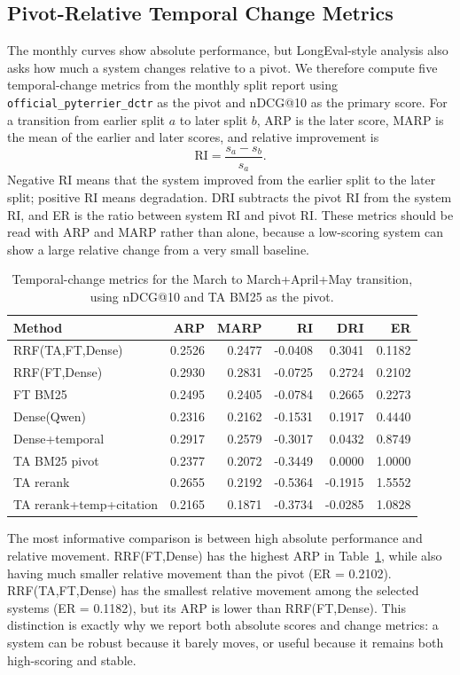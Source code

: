 \documentclass[11pt]{article}
\begin{document}
\subsection{Pivot-Relative Temporal Change Metrics}

The monthly curves show absolute performance, but LongEval-style analysis also asks how much a system changes relative to a pivot. We therefore compute five temporal-change metrics from the monthly split report using \texttt{official\_pyterrier\_dctr} as the pivot and nDCG@10 as the primary score. For a transition from earlier split $a$ to later split $b$, ARP is the later score, MARP is the mean of the earlier and later scores, and relative improvement is
\[
\mathrm{RI} = \frac{s_a - s_b}{s_a}.
\]
Negative RI means that the system improved from the earlier split to the later split; positive RI means degradation. DRI subtracts the pivot RI from the system RI, and ER is the ratio between system RI and pivot RI. These metrics should be read with ARP and MARP rather than alone, because a low-scoring system can show a large relative change from a very small baseline.

\begin{table}[ht]
\centering
\caption{Temporal-change metrics for the March to March+April+May transition, using nDCG@10 and TA BM25 as the pivot.}
\label{tab:temporal-change}
\begin{tabular}{lrrrrr}
\toprule
Method & ARP & MARP & RI & DRI & ER \\
\midrule
RRF(TA,FT,Dense) & 0.2526 & 0.2477 & -0.0408 & 0.3041 & 0.1182 \\
RRF(FT,Dense) & 0.2930 & 0.2831 & -0.0725 & 0.2724 & 0.2102 \\
FT BM25 & 0.2495 & 0.2405 & -0.0784 & 0.2665 & 0.2273 \\
Dense(Qwen) & 0.2316 & 0.2162 & -0.1531 & 0.1917 & 0.4440 \\
Dense+temporal & 0.2917 & 0.2579 & -0.3017 & 0.0432 & 0.8749 \\
TA BM25 pivot & 0.2377 & 0.2072 & -0.3449 & 0.0000 & 1.0000 \\
TA rerank & 0.2655 & 0.2192 & -0.5364 & -0.1915 & 1.5552 \\
TA rerank+temp+citation & 0.2165 & 0.1871 & -0.3734 & -0.0285 & 1.0828 \\
\bottomrule
\end{tabular}
\end{table}

The most informative comparison is between high absolute performance and relative movement. RRF(FT,Dense) has the highest ARP in Table~\ref{tab:temporal-change}, while also having much smaller relative movement than the pivot (ER = 0.2102). RRF(TA,FT,Dense) has the smallest relative movement among the selected systems (ER = 0.1182), but its ARP is lower than RRF(FT,Dense). This distinction is exactly why we report both absolute scores and change metrics: a system can be robust because it barely moves, or useful because it remains both high-scoring and stable.
\end{document}
